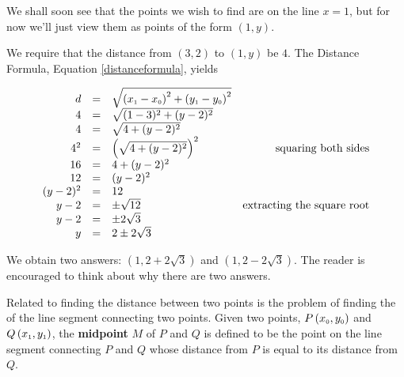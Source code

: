 {
We shall soon see that the points we wish to find are on the line $x=1$, but for now we'll just view them as points of the form $(1,y)$.  

We require that the distance from $(3,2)$ to $(1,y)$ be $4$.  The Distance Formula, Equation \ref{distanceformula}, yields

\[ \begin{array}{rclr} 
d &  = & \sqrt{\left(x_{\mbox{\tiny$1$}}-x_{\mbox{\tiny$0$}}\right)^2+\left(y_{\mbox{\tiny$1$}}-y_{\mbox{\tiny$0$}}\right)^2}  & \\
4 &  = & \sqrt{(1-3)^2+(y-2)^2} & \\
4  & = & \sqrt{4+(y-2)^2} & \\ 
4^2 & = & \left(\sqrt{4+(y-2)^2}\right)^2 &  \mbox{squaring both sides} \\
16 & = & 4+(y-2)^2 & \\
12 & = & (y-2)^2 & \\
(y-2)^2 & = & 12 &  \\
y - 2 & = & \pm \sqrt{12} & \mbox{extracting the square root} \\
y-2 & = & \pm 2 \sqrt{3} & \\
y & = & 2 \pm 2 \sqrt{3}  & 
\end{array} \]


We obtain two answers:  $(1, 2 + 2 \sqrt{3})$ and $(1, 2-2 \sqrt{3}).$  The reader is encouraged to think about why there are two answers.}


\medskip

Related to finding the distance between two points is the problem of finding the   of the line segment connecting two points.  Given two points, $P\left(x_{\mbox{\tiny$0$}}, y_{\mbox{\tiny$0$}}\right)$ and $Q\left(x_{\mbox{\tiny$1$}}, y_{\mbox{\tiny$1$}}\right)$, the \textbf{midpoint} $M$  of $P$ and $Q$ is defined to be the point on the line segment connecting $P$ and $Q$ whose distance from $P$ is equal to its distance from  $Q$.  


